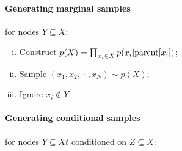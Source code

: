 \documentclass{article}
\begin{document}
	\paragraph{Generating marginal samples} for nodes $Y \subseteq X$:
	\begin{enumerate}[(i)]
		\item Construct $p(X) = \prod_{x_i \in X} p(x_i|\text{{parent}}[x_i])$;
		\item Sample $(x_1, x_2, \cdots, x_N) \sim p(X)$;
		\item Ignore $x_i \notin Y$.
	\end{enumerate}
	
	\paragraph{Generating conditional samples} for nodes $Y \subseteq Xt$ conditioned on $Z \subseteq X$:
	
\end{document}
